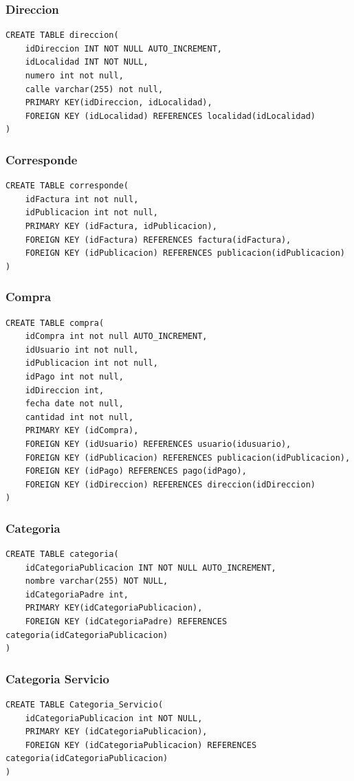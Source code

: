 \documentclass[a4paper, 10pt, twoside]{article}
\begin{document}
\subsubsection{Direccion}
\begin{verbatim}
CREATE TABLE direccion(
	idDireccion INT NOT NULL AUTO_INCREMENT,
	idLocalidad INT NOT NULL,
    numero int not null,
    calle varchar(255) not null,
    PRIMARY KEY(idDireccion, idLocalidad),
    FOREIGN KEY (idLocalidad) REFERENCES localidad(idLocalidad)
)
\end{verbatim}
\subsubsection{Corresponde}
\begin{verbatim}
CREATE TABLE corresponde(
	idFactura int not null,
    idPublicacion int not null,
    PRIMARY KEY (idFactura, idPublicacion),
    FOREIGN KEY (idFactura) REFERENCES factura(idFactura),
    FOREIGN KEY (idPublicacion) REFERENCES publicacion(idPublicacion)
)
\end{verbatim}
\subsubsection{Compra}
\begin{verbatim}
CREATE TABLE compra(
	idCompra int not null AUTO_INCREMENT,
    idUsuario int not null,
    idPublicacion int not null,
    idPago int not null,
    idDireccion int,
    fecha date not null,
    cantidad int not null,
    PRIMARY KEY (idCompra),
    FOREIGN KEY (idUsuario) REFERENCES usuario(idusuario),
    FOREIGN KEY (idPublicacion) REFERENCES publicacion(idPublicacion),
    FOREIGN KEY (idPago) REFERENCES pago(idPago),
    FOREIGN KEY (idDireccion) REFERENCES direccion(idDireccion)
)

\end{verbatim}
\subsubsection{Categoria}
\begin{verbatim}
CREATE TABLE categoria(
	idCategoriaPublicacion INT NOT NULL AUTO_INCREMENT,
	nombre varchar(255) NOT NULL,
    idCategoriaPadre int,
    PRIMARY KEY(idCategoriaPublicacion),
    FOREIGN KEY (idCategoriaPadre) REFERENCES categoria(idCategoriaPublicacion)
)
\end{verbatim}
\subsubsection{Categoria Servicio}
\begin{verbatim}
CREATE TABLE Categoria_Servicio(
	idCategoriaPublicacion int NOT NULL,
    PRIMARY KEY (idCategoriaPublicacion),
    FOREIGN KEY (idCategoriaPublicacion) REFERENCES categoria(idCategoriaPublicacion)
)
\end{verbatim}
\end{document}
